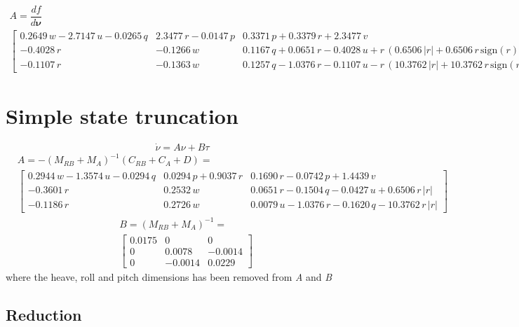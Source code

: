 \documentclass[12pt,a4]{article}
\begin{document}
\begin{multline}
	A = \dfrac{df}{d\bm{\nu}}\\
	\left[\begin{array}{ccc} 0.2649\,w-2.7147\,u-0.0265\,q & 2.3477\,r-0.0147\,p & 0.3371\,p+0.3379\,r+2.3477\,v\\ -0.4028\,r & -0.1266\,w & 0.1167\,q+0.0651\,r-0.4028\,u+r\,\left(0.6506\,\left|r\right|+0.6506\,r\,\mathrm{sign}\left(r\right)+0.0651\right)+0.6506\,r\,\left|r\right|\\ -0.1107\,r & -0.1363\,w & 0.1257\,q-1.0376\,r-0.1107\,u-r\,\left(10.3762\,\left|r\right|+10.3762\,r\,\mathrm{sign}\left(r\right)+1.0376\right)-10.3762\,r\,\left|r\right| \end{array}\right]
\end{multline}

\section{Simple state truncation}
\begin{equation*}
	\dot{\nu} = A \nu + B \tau
\end{equation*}
\begin{align*}
	 & A =  -(M_{RB} + M_A)^{-1}(C_{RB}+C_A+D)= \\
	 & \left[\begin{array}{ccc} 0.2944\,w-1.3574\,u-0.0294\,q & 0.0294\,p+0.9037\,r & 0.1690\,r-0.0742\,p+1.4439\,v\\ -0.3601\,r & 0.2532\,w & 0.0651\,r-0.1504\,q-0.0427\,u+0.6506\,r\,\left|r\right|\\ -0.1186\,r & 0.2726\,w & 0.0079\,u-1.0376\,r-0.1620\,q-10.3762\,r\,\left|r\right| \end{array}\right]
\end{align*}
\begin{align*}
	 & B = (M_{RB} + M_A)^{-1}=                \\
	 & \left[\begin{array}{ccc} 0.0175 & 0 & 0\\ 0 & 0.0078 & -0.0014\\ 0 & -0.0014 & 0.0229 \end{array}\right]
\end{align*}
where the heave, roll and pitch dimensions has been removed from \textit{A} and \textit{B}

\subsection{Reduction}
\end{document}
